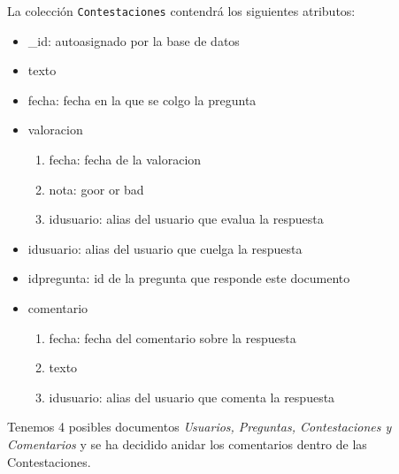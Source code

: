 \documentclass{article}
\begin{document}
    \par
    La colección \texttt{Contestaciones} contendrá los siguientes atributos:   
    \begin{itemize}  
        \item \_id: autoasignado por la base de datos 
        \item texto
        \item fecha: fecha en la que se colgo la pregunta
        \item valoracion
        \begin{enumerate}
          \item fecha: fecha de la valoracion
          \item nota: goor or bad
          \item idusuario: alias del usuario que evalua la respuesta
        \end{enumerate}
        \item idusuario: alias del usuario que cuelga la respuesta
        \item idpregunta: id de la pregunta que responde este documento
        \item comentario
        \begin{enumerate}
          \item fecha: fecha del comentario sobre la respuesta
          \item texto
          \item idusuario: alias del usuario que comenta la respuesta
        \end{enumerate}
    \end{itemize}
    \par
    Tenemos 4 posibles documentos \emph{Usuarios, Preguntas, Contestaciones y Comentarios}
    y se ha decidido anidar los comentarios dentro de las Contestaciones. 
\end{document}
